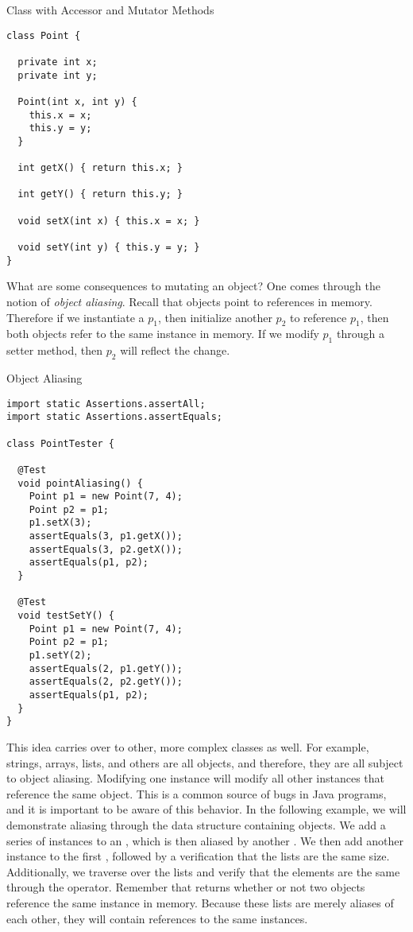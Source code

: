 \begin{cl}[]{ Class with Accessor and Mutator Methods}
\begin{lstlisting}[language=MyJava]
class Point {

  private int x;
  private int y;

  Point(int x, int y) { 
    this.x = x; 
    this.y = y; 
  }

  int getX() { return this.x; }

  int getY() { return this.y; }

  void setX(int x) { this.x = x; }

  void setY(int y) { this.y = y; }
}
\end{lstlisting}
\end{cl}

What are some consequences to mutating an object? One comes through the notion of \emph{object aliasing}. Recall that objects point to references in memory. Therefore if we instantiate a  $p_1$, then initialize another  $p_2$ to reference $p_1$, then both objects refer to the same  instance in memory. If we modify $p_1$ through a setter method, then $p_2$ will reflect the change.

\begin{cl}[]{Object Aliasing}
\begin{lstlisting}[language=MyJava]
import static Assertions.assertAll;
import static Assertions.assertEquals;

class PointTester {

  @Test
  void pointAliasing() {
    Point p1 = new Point(7, 4);
    Point p2 = p1;
    p1.setX(3);
    assertEquals(3, p1.getX());
    assertEquals(3, p2.getX());
    assertEquals(p1, p2);
  }

  @Test
  void testSetY() {
    Point p1 = new Point(7, 4);
    Point p2 = p1;
    p1.setY(2);
    assertEquals(2, p1.getY());
    assertEquals(2, p2.getY());
    assertEquals(p1, p2);
  }
}
\end{lstlisting}
\end{cl}

This idea carries over to other, more complex classes as well. For example, strings, arrays, lists, and others are all objects, and therefore, they are all subject to object aliasing. Modifying one  instance will modify all other  instances that reference the same object. This is a common source of bugs in Java programs, and it is important to be aware of this behavior. In the following example, we will demonstrate aliasing through the  data structure containing  objects. We add a series of  instances to an , which is then aliased by another . We then add another  instance to the first , followed by a verification that the lists are the same size. Additionally, we traverse over the lists and verify that the elements are the same through the \ttt{==} operator. Remember that \ttt{==} returns whether or not two objects reference the same instance in memory. Because these lists are merely aliases of each other, they will contain references to the same  instances.


